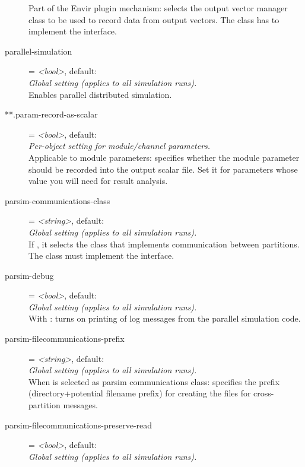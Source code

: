 \begin{description}
    Part of the Envir plugin mechanism: selects the output vector manager class
    to be used to record data from output vectors. The class has to implement
    the  interface.
\item[parallel-simulation] = \textit{<bool>}, default: \\
    \textit{Global setting (applies to all simulation runs).}\\
    Enables parallel distributed simulation.
\item[**.param-record-as-scalar] = \textit{<bool>}, default: \\
    \textit{Per-object setting for module/channel parameters.}\\
    Applicable to module parameters: specifies whether the module parameter
    should be recorded into the output scalar file. Set it for parameters whose
    value you will need for result analysis.
\item[parsim-communications-class] = \textit{<string>}, default: \\
    \textit{Global setting (applies to all simulation runs).}\\
    If , it selects the
    class that implements communication between partitions. The class must
    implement the  interface.
\item[parsim-debug] = \textit{<bool>}, default: \\
    \textit{Global setting (applies to all simulation runs).}\\
    With : turns on
    printing of log messages from the parallel simulation code.
\item[parsim-filecommunications-prefix] = \textit{<string>}, default: \\
    \textit{Global setting (applies to all simulation runs).}\\
    When  is selected as parsim communications
    class: specifies the prefix (directory+potential filename prefix) for
    creating the files for cross-partition messages.
\item[parsim-filecommunications-preserve-read] = \textit{<bool>}, default: \\
    \textit{Global setting (applies to all simulation runs).}\\

\end{description}
